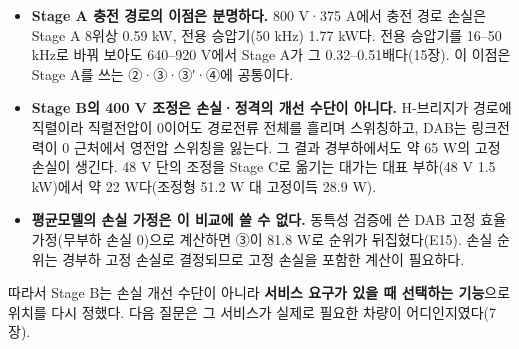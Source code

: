 \begin{itemize}
\item \textbf{Stage A 충전 경로의 이점은 분명하다.} 800 V·375 A에서 충전 경로 손실은 Stage A 8위상 0.59 kW, 전용 승압기(50 kHz) 1.77 kW다. 전용 승압기를 16–50 kHz로 바꿔 보아도 640–920 V에서 Stage A가 그 0.32–0.51배다(15장). 이 이점은 Stage A를 쓰는 ②·③·③′·④에 공통이다.
\item \textbf{Stage B의 400 V 조정은 손실·정격의 개선 수단이 아니다.} H-브리지가 경로에 직렬이라 직렬전압이 0이어도 경로전류 전체를 흘리며 스위칭하고, DAB는 링크전력이 0 근처에서 영전압 스위칭을 잃는다. 그 결과 경부하에서도 약 65 W의 고정 손실이 생긴다. 48 V 단의 조정을 Stage C로 옮기는 대가는 대표 부하(48 V 1.5 kW)에서 약 22 W다(조정형 51.2 W 대 고정이득 28.9 W).
\item \textbf{평균모델의 손실 가정은 이 비교에 쓸 수 없다.} 동특성 검증에 쓴 DAB 고정 효율 가정(무부하 손실 0)으로 계산하면 ③이 81.8 W로 순위가 뒤집혔다(E15). 손실 순위는 경부하 고정 손실로 결정되므로 고정 손실을 포함한 계산이 필요하다.
\end{itemize}

따라서 Stage B는 손실 개선 수단이 아니라 \textbf{서비스 요구가 있을 때 선택하는 기능}으로 위치를 다시 정했다. 다음 질문은 그 서비스가 실제로 필요한 차량이 어디인지였다(7장).
